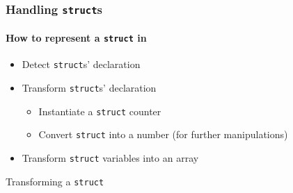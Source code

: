 \begin{frame}
  \frametitle{Handling \texttt{struct}s}
  \framesubtitle{How to represent a \texttt{struct} in \gotopins}
  \begin{itemize}
    \item Detect \texttt{struct}s' declaration
    \item Transform \texttt{struct}s' declaration
      \begin{itemize}
        \item Instantiate a \texttt{struct} counter
        \item Convert \texttt{struct} into a number (for further manipulations)
      \end{itemize}
    \item Transform \texttt{struct} variables into an array
  \end{itemize}

  \begin{block}{Transforming a \texttt{struct}}
    \begin{columns}
      \begin{column}{0.49\textwidth}
        \centering
      \end{column}
    \end{columns}
  \end{block}
\end{frame}
